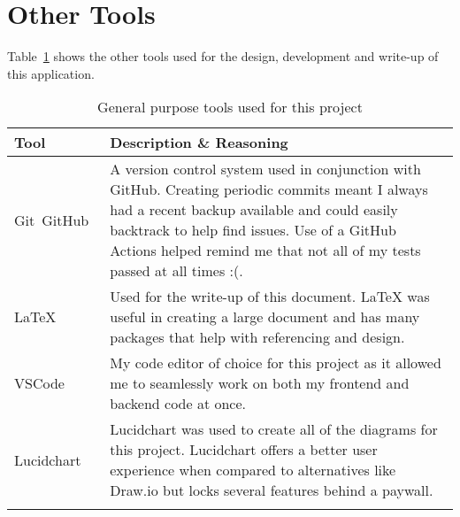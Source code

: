 \section{Other Tools}

Table~\ref{tab:tools-other} shows the other tools used for the design, development and write-up of this application.

\begin{longtable}{p{} p{}}
  \toprule
  \textbf{Tool} & \textbf{Description \& Reasoning}
  \\\midrule\midrule
  Git~\cite{noauthor_git_nodate}\newline GitHub~\cite{noauthor_github_nodate}
  & \small A version control system used in conjunction with GitHub. Creating periodic commits meant I always had a recent backup available and could easily backtrack to help find issues.
  Use of a GitHub Actions helped remind me that not all of my tests passed at all times :(.\\
  LaTeX~\cite{noauthor_latex_nodate}
  & \small Used for the write-up of this document. LaTeX was useful in creating a large document and has many packages that help with referencing and design.\\
  VSCode~\cite{noauthor_visual_nodate}
  & \small My code editor of choice for this project as it allowed me to seamlessly work on both my frontend and backend code at once. \\
  Lucidchart~\cite{noauthor_lucidchart_nodate}
  & \small Lucidchart was used to create all of the diagrams for this project. Lucidchart offers a better user experience when compared to alternatives like Draw.io but locks several features behind a paywall.
  \\\bottomrule\bottomrule
  \caption{General purpose tools used for this project}
  \label{tab:tools-other}
\end{longtable}

